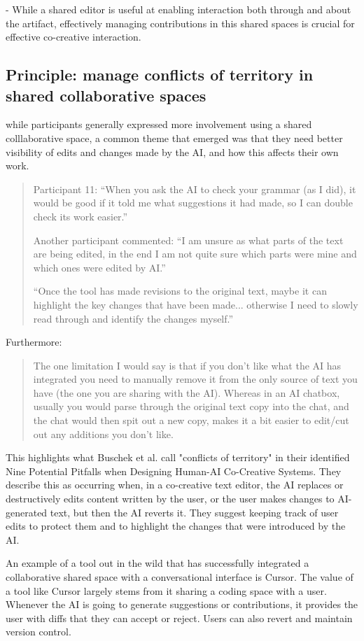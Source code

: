 - While a shared editor is useful at enabling interaction both through and about the artifact, effectively managing contributions in this shared spaces is crucial for effective co-creative interaction. 

\subsection{Principle: manage conflicts of territory in shared collaborative spaces}

while participants generally expressed more involvement using a shared colllaborative space, a common theme that emerged was that they need better visibility of edits and changes made by the AI, and how this affects their own work. 
\begin{quote}
Participant 11: “When you ask the AI to check your grammar (as I did), it would be good if it told me what suggestions it had made, so I can double check its work easier.”

Another participant commented: “I am unsure as what parts of the text are being edited, in the end I am not quite sure which parts were mine and which ones were edited by AI.”

“Once the tool has made revisions to the original text, maybe it can highlight the key changes that have been made... otherwise I need to slowly read through and identify the changes myself.”
\end{quote}
Furthermore:
\begin{quote}
The one limitation I would say is that if you don't like what the AI has integrated you need to manually remove it from the only source of text you have (the one you are sharing with the AI). Whereas in an AI chatbox, usually you would parse through the original text copy into the chat, and the chat would then spit out a new copy, makes it a bit easier to edit/cut out any additions you don't like.
\end{quote}
This highlights what Buschek et al. \cite{Buschek2021-ks} call "conflicts of territory" in their identified Nine Potential Pitfalls when Designing Human-AI Co-Creative Systems. They describe this as occurring when, in a co-creative text editor, the AI replaces or destructively edits content written by the user, or the user makes changes to AI-generated text, but then the AI reverts it. They suggest keeping track of user edits to protect them and to highlight the changes that were introduced by the AI.

An example of a tool out in the wild that has successfully integrated a collaborative shared space with a conversational interface is Cursor. The value of a tool like Cursor largely stems from it sharing a coding space with a user. Whenever the AI is going to generate suggestions or contributions, it provides the user with diffs that they can accept or reject. Users can also revert and maintain version control.

